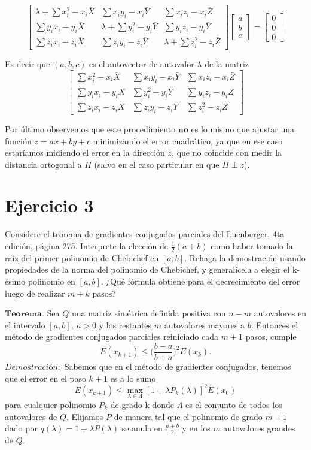\documentclass[12pt]{article}
\begin{document}
\[
\begin{bmatrix}
\lambda + \sum x_i^2 - x_i\bar{X} & \sum x_iy_i - x_i\bar{Y} & \sum x_iz_i - x_i\bar{Z} \\
\sum y_ix_i-y_i\bar{X} & \lambda + \sum y_i^2-y_i\bar{Y} & \sum y_iz_i-y_i \bar{Y} \\
\sum z_ix_i-z_i\bar{X} & \sum z_iy_i-z_i\bar{Y} & \lambda + \sum z_i^2-z_i\bar{Z}
\end{bmatrix}
\begin{bmatrix}
    a \\
    b \\
    c
\end{bmatrix} = 
\begin{bmatrix}
    0 \\
    0 \\
    0
\end{bmatrix}
\]

Es decir que $(a, b, c)$ es el autovector de autovalor $\lambda$ de la matriz
\[
\begin{bmatrix}
\sum x_i^2 - x_i\bar{X} & \sum x_iy_i - x_i\bar{Y} & \sum x_iz_i - x_i\bar{Z} \\
\sum y_ix_i-y_i\bar{X} & \sum y_i^2-y_i\bar{Y} & \sum y_iz_i-y_i \bar{Z} \\
\sum z_ix_i-z_i\bar{X} & \sum z_iy_i-z_i\bar{Y} & \sum z_i^2-z_i\bar{Z}
\end{bmatrix}
\]
\bigskip
\bigskip
\bigskip

Por último observemos que este procedimiento \(\mathbf{no}\) es lo mismo que ajustar una función \(z = ax + by + c \) minimizando el error cuadrático, ya que en ese caso estaríamos midiendo el error en la dirección $z$, que no coincide con medir la distancia ortogonal a $\Pi$ (salvo en el caso particular en que \(\Pi \perp z\)).

\bigskip
\section*{Ejercicio 3}
\bigskip
Considere el teorema de gradientes conjugados parciales del Luenberger, 4ta edición, página 275. Interprete la elección de $\frac{1}{2}(a + b)$ como haber tomado la raíz del primer polinomio de Chebichef en $[a, b]$. Rehaga la demostración usando propiedades de la norma del polinomio de Chebichef, y generalícela a elegir el k-ésimo polinomio en $[a, b]$. ¿Qué fórmula obtiene para el decrecimiento del error luego de realizar $m + k$ pasos?

\bigskip
$\mathbf{Teorema}.$ Sea $Q$ una matriz simétrica definida positiva con $n-m$ autovalores en el intervalo $[a, b], \ a>0$ y los restantes $m$ autovalores mayores a $b$. Entonces el método de gradientes conjugados parciales reiniciado cada $m+1$ pasos, cumple
\[ E(x_{k+1}) \leq \bigg( \frac{b-a}{b+a} \bigg)^2 E(x_k). \]
$\textit{Demostración}:$ Sabemos que en el método de gradientes conjugados, tenemos que el error en el paso $k+1$ es a lo sumo
\[ E(x_{k+1}) \leq \max_{\lambda \in \Lambda} [1 + \lambda P_k(\lambda)]^2 E(x_0) \]
para cualquier polinomio $P_k$ de grado k donde $\Lambda$ es el conjunto de todos los autovalores de $Q$. Elijamos $P$ de manera tal que el polinomio de grado $m+1$ dado por $q(\lambda) = 1 + \lambda P(\lambda)$ se anula en $\frac{a+b}{2}$ y en los $m$ autovalores grandes de $Q.$
\end{document}
